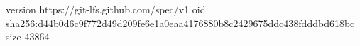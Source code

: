 version https://git-lfs.github.com/spec/v1
oid sha256:d44b0d6c9f772d49d209fe6e1a0eaa4176880b8c2429675ddc438fdddbd618bc
size 43864
